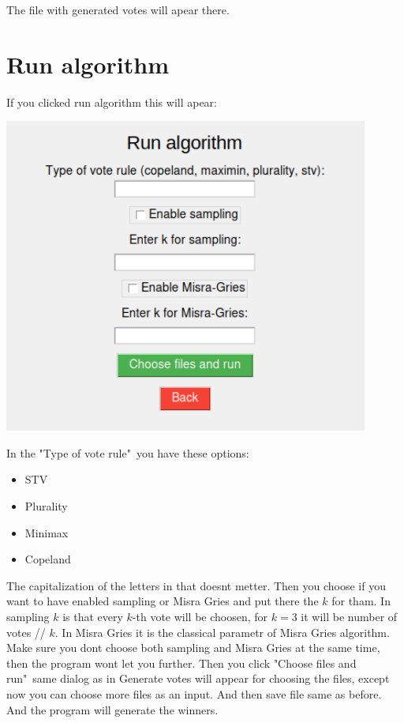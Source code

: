 \documentclass[a4paper,12pt]{report}
\begin{document}
	The file with generated votes will apear there.
	
	\section{Run algorithm}
	
	If you clicked run algorithm this will apear:
	
	\begin{center}
		\includegraphics[width=12cm]{run_algorithm.png}
	\end{center}
	
	In the "Type of vote rule"\ you have these options:
	
	\begin{itemize}
		\item STV
		\item Plurality
		\item Minimax
		\item Copeland
	\end{itemize}
	
	The capitalization of the letters in that doesnt metter. Then you choose if you want to have enabled sampling or Misra Gries and put there the $k$ for tham. In sampling $k$ is that every $k$-th vote will be choosen, for $k = 3$ it will be number of votes // $k$. In Misra Gries it is the classical parametr of Misra Gries algorithm. Make sure you dont choose both sampling and Misra Gries at the same time, then the program wont let you further. Then you click "Choose files and run"\ same dialog as in Generate votes will appear for choosing the files, except now you can choose more files as an input. And then save file same as before. And the program will generate the winners.
	
\end{document}
